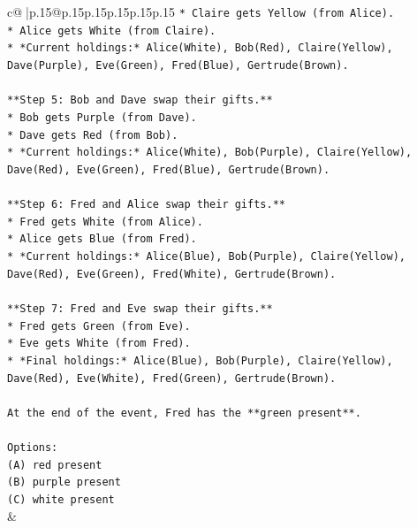 \documentclass{article}
\begin{document}
{\begin{supertabular}{c@{$\;$}|p{.15\linewidth}@{}p{.15\linewidth}p{.15\linewidth}p{.15\linewidth}p{.15\linewidth}p{.15\linewidth}}
{{{\texttt{*   Claire gets Yellow (from Alice).} \\
\texttt{*   Alice gets White (from Claire).} \\
\texttt{*   *Current holdings:* Alice(White), Bob(Red), Claire(Yellow), Dave(Purple), Eve(Green), Fred(Blue), Gertrude(Brown).} \\
\\ 
\texttt{**Step 5: Bob and Dave swap their gifts.**} \\
\texttt{*   Bob gets Purple (from Dave).} \\
\texttt{*   Dave gets Red (from Bob).} \\
\texttt{*   *Current holdings:* Alice(White), Bob(Purple), Claire(Yellow), Dave(Red), Eve(Green), Fred(Blue), Gertrude(Brown).} \\
\\ 
\texttt{**Step 6: Fred and Alice swap their gifts.**} \\
\texttt{*   Fred gets White (from Alice).} \\
\texttt{*   Alice gets Blue (from Fred).} \\
\texttt{*   *Current holdings:* Alice(Blue), Bob(Purple), Claire(Yellow), Dave(Red), Eve(Green), Fred(White), Gertrude(Brown).} \\
\\ 
\texttt{**Step 7: Fred and Eve swap their gifts.**} \\
\texttt{*   Fred gets Green (from Eve).} \\
\texttt{*   Eve gets White (from Fred).} \\
\texttt{*   *Final holdings:* Alice(Blue), Bob(Purple), Claire(Yellow), Dave(Red), Eve(White), Fred(Green), Gertrude(Brown).} \\
\\ 
\texttt{At the end of the event, Fred has the **green present**.} \\
\\ 
\texttt{Options:} \\
\texttt{(A) red present} \\
\texttt{(B) purple present} \\
\texttt{(C) white present} \\
            }
        }
    }
    & \\ \\


\end{supertabular}}
\end{document}

